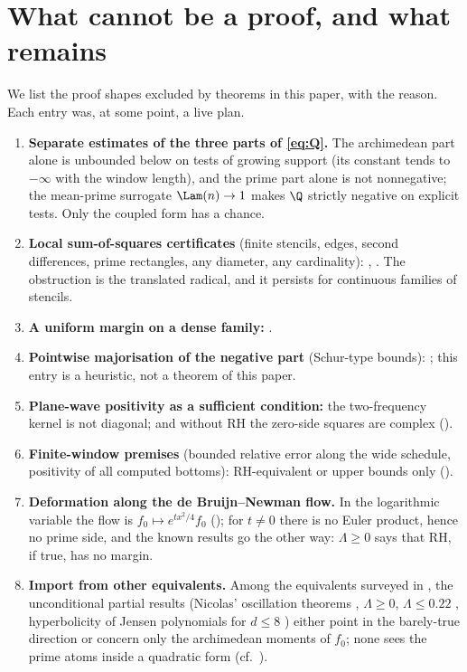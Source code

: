 \section{What cannot be a proof, and what remains}\label{sec:ledger}

We list the proof shapes excluded by theorems in this paper, with the reason. Each entry was, at some point, a live plan.

\begin{enumerate}[leftmargin=2em,itemsep=2pt]
\item \textbf{Separate estimates of the three parts of \eqref{eq:Q}.} The archimedean part alone is unbounded below on tests of growing support
 (its constant tends to $-\infty$ with the window length), and the prime part alone is not nonnegative; the mean-prime surrogate $\Lam(n)\to1$ makes $\Q$ strictly negative on
 explicit tests. Only the coupled form has a chance.
\item \textbf{Local sum-of-squares certificates} (finite stencils, edges, second differences, prime rectangles, any diameter, any
 cardinality): , . The obstruction is the translated radical, and it persists for continuous
 families of stencils.
\item \textbf{A uniform margin on a dense family:} .
\item \textbf{Pointwise majorisation of the negative part} (Schur-type bounds): ; this entry is a heuristic, not a theorem of this paper.
\item \textbf{Plane-wave positivity as a sufficient condition:} the two-frequency kernel is not diagonal; and without RH the
 zero-side squares are complex ().
\item \textbf{Finite-window premises} (bounded relative error along the wide schedule, positivity of all computed bottoms):
 RH-equivalent or upper bounds only ().
\item \textbf{Deformation along the de Bruijn--Newman flow.} In the logarithmic variable the flow is $f_0\mapsto e^{tx^2/4}f_0$
 (); for $t\ne0$ there is no Euler product, hence no prime side, and the known results go the other way:
 $\Lambda\ge0$ \cite{RodgersTao2018} says that RH, if true, has no margin.
\item \textbf{Import from other equivalents.} Among the equivalents surveyed in \cite{Broughan2023}, the unconditional partial results
 (Nicolas' oscillation theorems \cite{Nicolas1983}, $\Lambda\ge0$, $\Lambda\le0.22$ \cite{Polymath15}, hyperbolicity of Jensen
 polynomials for $d\le8$ \cite{GORZ2019}) either point in the barely-true direction or concern only the archimedean moments of
 $f_0$; none sees the prime atoms inside a quadratic form (cf.\ \cite{Farmer2020}).
\end{enumerate}

